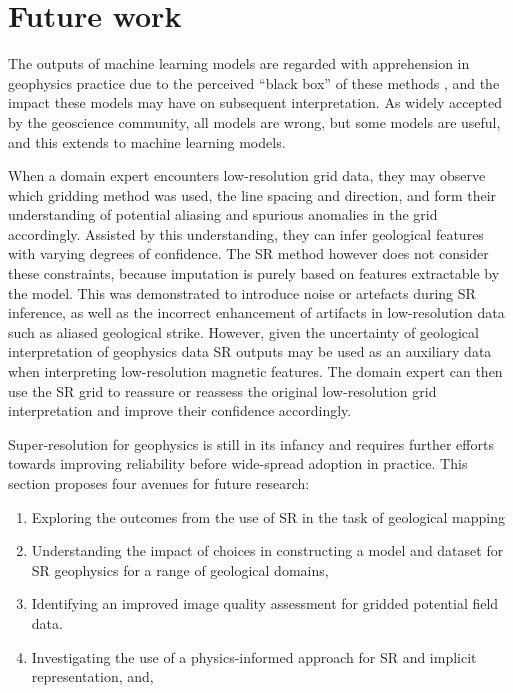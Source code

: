 % 
% 


\chapter{Future work}
\label{ch:futurework}
The outputs of machine learning models are regarded with apprehension in geophysics practice due to the perceived “black box” of these methods \parencite{delaatAlgorithmicDecisionMakingBased2018,rudinStopExplainingBlack2019}, and the impact these models may have on subsequent interpretation.
As widely accepted by the geoscience community, all models are wrong, but some models are useful, and this extends to machine learning models.

When a domain expert encounters low-resolution grid data, they may observe which gridding method was used, the line spacing and direction, and form their understanding of potential aliasing and spurious anomalies in the grid accordingly.
Assisted by this understanding, they can infer geological features with varying degrees of confidence.
The SR method however does not consider these constraints, because imputation is purely based on features extractable by the model.
This was demonstrated to introduce noise or artefacts during SR inference, as well as the incorrect enhancement of artifacts in low-resolution data such as aliased geological strike.
However, given the uncertainty of geological interpretation of geophysics data \parencite{sivarajahIdentifyingEffectiveInterpretation2013} SR outputs may be used as an auxiliary data when interpreting low-resolution magnetic features.
The domain expert can then use the SR grid to reassure or reassess the original low-resolution grid interpretation and improve their confidence accordingly.

Super-resolution for geophysics is still in its infancy and requires further efforts towards improving reliability before wide-spread adoption in practice.
This section proposes four avenues for future research:
\begin{enumerate}
    \item{} Exploring the outcomes from the use of SR in the task of geological mapping
    \item{} Understanding the impact of choices in constructing a model and dataset for SR geophysics for a range of geological domains,
    \item{} Identifying an improved image quality assessment for gridded potential field data.
    \item{} Investigating the use of a physics-informed approach for SR and implicit representation, and,
\end{enumerate}


